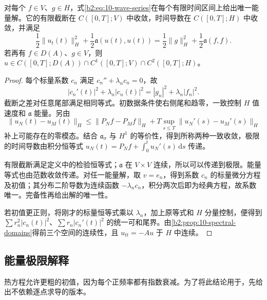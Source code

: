 \begin{theorem}[波动问题的能量极限]\label{b2:thm:10-wave-energy-limit}
对每个 \(f\in V\)、\(g\in H\)，式\eqref{b2:eq:10-wave-series}在每个有限时间区间上给出唯一能量解。它的有限截断在 \(C([0,T];V)\) 中收敛，时间导数在 \(C([0,T];H)\) 中收敛，并满足
\begin{equation}\label{b2:eq:10-wave-energy}
 \dfrac12\|u_t(t)\|_H^2+\dfrac12\mathfrak a(u(t),u(t))
 =\dfrac12\|g\|_H^2+\dfrac12\mathfrak a(f,f).
\end{equation}
若再有 \(f\in D(A)\)、\(g\in V\)，则 \(u\in C([0,T];D(A))\cap C^1([0,T];V)\cap C^2([0,T];H)\)。
\end{theorem}
\begin{proof}
每个标量系数 \(c_n\) 满足 \(c_n''+\lambda_nc_n=0\)，故
\[
 |c_n'(t)|^2+\lambda_n|c_n(t)|^2
 =|g_n|^2+\lambda_n|f_n|^2.
\]
截断之差对任意尾部满足相同等式。初数据条件使右侧尾和趋零，一致控制 \(H\) 值速度和 \(\mathfrak a\) 能量。另由
\[
 \|u_N(t)-u_M(t)\|_H
 \leq\|P_Nf-P_Mf\|_H
 +T\sup_{s\leq T}\|u_N'(s)-u_M'(s)\|_H
\]
补上可能存在的零模态。结合 \(\mathfrak a_\sigma\) 与 \(H^1\) 的等价性，得到所称两种一致收敛，极限的时间导数由积分恒等式 \(u_N(t)=P_Nf+\int_0^tu_N'(s)\,\mathrm{d}s\) 传递。

有限截断满足定义中的检验恒等式；\(\mathfrak a\) 在 \(V\times V\) 连续，所以可以传递到极限。能量等式也由范数收敛传递。对任一能量解，取 \(v=e_n\)，得到系数 \(c_n\) 的标量微分方程及初值；其分布二阶导数为连续函数 \(-\lambda_nc_n\)，积分两次后即为经典方程，故系数唯一。完备性再给出解的唯一性。

若初值更正则，将刚才的标量恒等式乘以 \(\lambda_n\)，加上原等式和 \(H\) 分量控制，便得到 \(\sum r_n^2|c_n(t)|^2\)、\(\sum r_n|c_n'(t)|^2\) 的统一可和尾界。由\cref{b2:prop:10-spectral-domains}得前三个空间的连续性，且 \(u_{tt}=-Au\) 于 \(H\) 中连续。
\end{proof}

\subsection{能量极限解释}
\label{b2:subsec:100403}

热方程允许更粗的初值，因为每个正频率都有指数衰减。为了将此结论用于，先给出不依赖逐点求导的版本。

